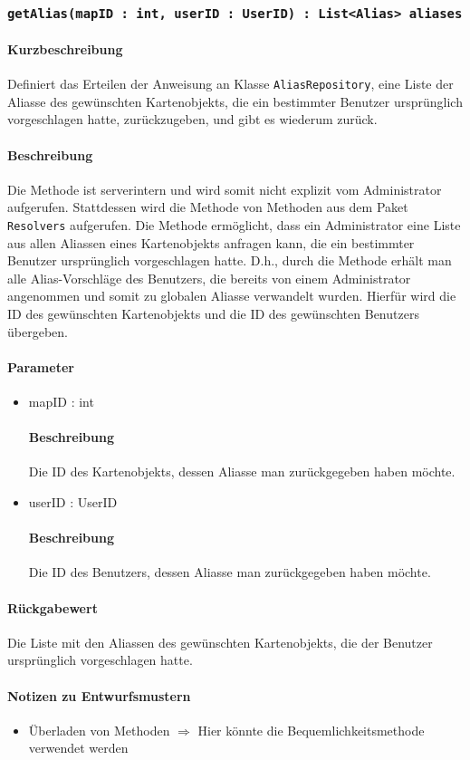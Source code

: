 \subsubsection{\texttt{getAlias(mapID : int, userID : UserID) : List<Alias> aliases}}%
\paragraph*{Kurzbeschreibung}
Definiert das Erteilen der Anweisung an Klasse \texttt{AliasRepository}, eine Liste der Aliasse des gewünschten Kartenobjekts, die ein bestimmter Benutzer ursprünglich vorgeschlagen hatte, zurückzugeben, und gibt es wiederum zurück.
\paragraph*{Beschreibung}
Die Methode ist serverintern und wird somit nicht explizit vom Administrator aufgerufen.
Stattdessen wird die Methode von Methoden aus dem Paket \texttt{Resolvers} aufgerufen.
Die Methode ermöglicht, dass ein Administrator eine Liste aus allen Aliassen eines Kartenobjekts anfragen kann, die ein bestimmter Benutzer ursprünglich vorgeschlagen hatte.
D.h., durch die Methode erhält man alle Alias-Vorschläge des Benutzers, die bereits von einem Administrator angenommen und somit zu globalen Aliasse verwandelt wurden.
Hierfür wird die ID des gewünschten Kartenobjekts und die ID des gewünschten Benutzers übergeben.
\paragraph*{Parameter}
\begin{itemize}
    \item mapID : int
    		\paragraph*{Beschreibung}
    		Die ID des Kartenobjekts, dessen Aliasse man zurückgegeben haben möchte.
    	\item userID : UserID
    		\paragraph*{Beschreibung}
    		Die ID des Benutzers, dessen Aliasse man zurückgegeben haben möchte.
\end{itemize}
\paragraph*{Rückgabewert}
Die Liste mit den Aliassen des gewünschten Kartenobjekts, die der Benutzer ursprünglich vorgeschlagen hatte.

\paragraph*{Notizen zu Entwurfsmustern}
\begin{itemize}
	\item Überladen von Methoden $\Rightarrow$ Hier könnte die Bequemlichkeitsmethode verwendet werden
\end{itemize}
